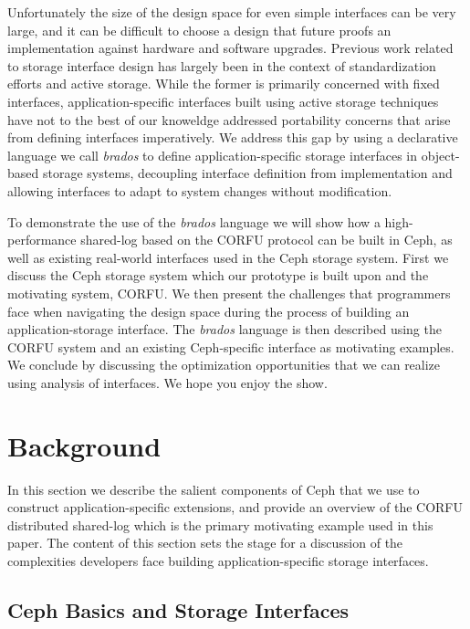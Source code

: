 \documentclass[10pt,twocolumn]{article}
\begin{document}
Unfortunately the size of the design space for even simple interfaces can
be very large, and it can be difficult to choose a design that future proofs an
implementation against hardware and software upgrades.
Previous work related to storage interface design has largely been in the
context of standardization efforts and active storage. While the former is
primarily concerned with fixed interfaces, application-specific interfaces
built using active storage techniques have not to the best of our knoweldge
addressed portability concerns that arise from defining interfaces
imperatively. We address this gap by using a declarative language we call
\emph{brados} to define application-specific storage interfaces in
object-based storage systems, decoupling interface definition from
implementation and allowing interfaces to adapt to system changes without
modification.

To demonstrate the use of the \emph{brados} language we will show how a
high-performance shared-log based on the CORFU protocol can be built in Ceph, as well
as existing real-world interfaces used in the Ceph storage system. First we
discuss the Ceph storage system which our prototype is built upon and the 
motivating system, CORFU. We then present the challenges that programmers face
when navigating the design space during the process of building an
application-storage interface. The \emph{brados} language is then described
using the CORFU system and an existing Ceph-specific interface as motivating examples.
We conclude by discussing the optimization opportunities that we can realize
using analysis of interfaces. We hope you enjoy the show.

\section{Background}

In this section we describe the salient components of Ceph that we use to
construct application-specific extensions, and provide an overview of the
CORFU distributed shared-log which is the primary motivating example used in
this paper. The content of this section sets the stage for a discussion of the
complexities developers face building application-specific storage interfaces.

\subsection{Ceph Basics and Storage Interfaces}
\label{sec:objclass}
\end{document}
